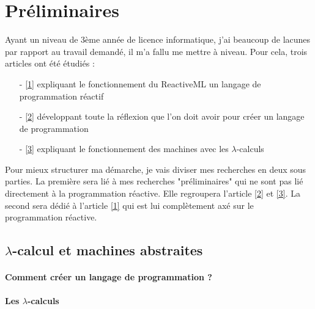 \documentclass[10pt,a4paper]{article}
\begin{document}
		
	
	\section{Préliminaires}
	 
	 	Ayant un niveau de 3ème année de licence informatique, j'ai beaucoup de lacunes par rapport au travail demandé, il m'a fallu me mettre à niveau. Pour cela, trois articles ont été étudiés : 
	 	\begin{enumerate}
	 		\item[-] \hyperref[ReactiveML]{[1]} expliquant le fonctionnement du ReactiveML un langage de programmation réactif
	 		\item[-] \hyperref[ZINC]{[2]} développant toute la réflexion que l'on doit avoir pour créer un langage de programmation
		 	\item[-] \hyperref[Calculi]{[3]} expliquant le fonctionnement des machines avec les $\lambda$-calculs
		 \end{enumerate}
 		 Pour mieux structurer ma démarche, je vais diviser mes recherches en deux sous parties. La première sera lié à mes recherches "préliminaires" qui ne sont pas lié directement à la programmation réactive. Elle regroupera l'article \hyperref[ZINC]{[2]} et \hyperref[Calculi]{[3]}. La second sera dédié à l'article \hyperref[ReactiveML]{[1]} qui est lui complètement axé sur le programmation réactive. 
	 
		\subsection{$\lambda$-calcul et machines abstraites}
			
			\paragraph{Comment créer un langage de programmation ?}
	
			\paragraph{Les  $\lambda$-calculs}
			
\end{document}
